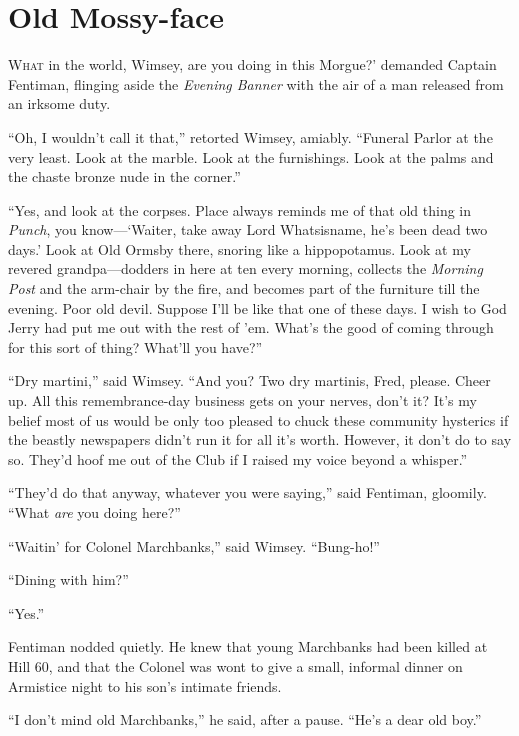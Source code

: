 \chapter{Old Mossy-face}
\lettrine[lines=4,ante=‘]{W}{hat} in the world, Wimsey, are you doing in this \newline Morgue?' demanded Captain Fentiman, flinging aside the \textit{Evening Banner} with the air of a man released from an irksome duty.

\enquote{Oh, I wouldn't call it that,} retorted Wimsey, amiably. \enquote{Funeral Parlor at the very least. Look at the marble. Look at the furnishings. Look at the palms and the chaste bronze nude in the corner.}

\enquote{Yes, and look at the corpses. Place always reminds me of that old thing in \textit{Punch}, you know---\enquote{Waiter, take away Lord Whatsisname, he's been dead two days.} Look at Old Ormsby there, snoring like a hippopotamus. Look at my revered grandpa\allowbreak---\allowbreak dodders in here at ten every morning, collects the \textit{Morning Post} and the arm-chair by the fire, and becomes part of the furniture till the evening. Poor old devil. Suppose I'll be like that one of these days. I wish to God Jerry had put me out with the rest of 'em. What's the good of coming through for this sort of thing? What'll you have?}

\enquote{Dry martini,} said Wimsey. \enquote{And you? Two dry martinis, Fred, please. Cheer up. All this remembrance-day business gets on your nerves, don't it? It's my belief most of us would be only too pleased to chuck these community hysterics if the beastly newspapers didn't run it for all it's worth. However, it don't do to say so. They'd hoof me out of the Club if I raised my voice beyond a whisper.}

\enquote{They'd do that anyway, whatever you were saying,} said Fentiman, gloomily. \enquote{What \textit{are} you doing here?}

\enquote{Waitin' for Colonel Marchbanks,} said Wimsey. \enquote{Bung-ho!}

\enquote{Dining with him?}

\enquote{Yes.}

Fentiman nodded quietly. He knew that young Marchbanks had been killed at Hill 60, and that the Colonel was wont to give a small, informal dinner on Armistice night to his son's intimate friends.

\enquote{I don't mind old Marchbanks,} he said, after a pause. \enquote{He's a dear old boy.}

